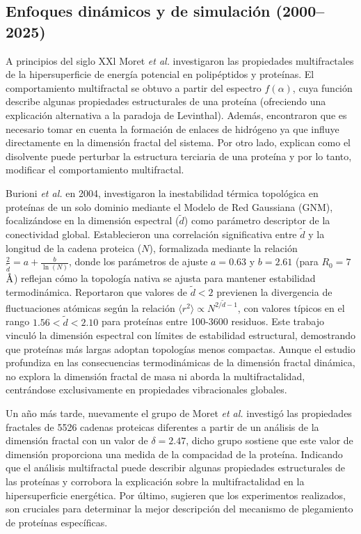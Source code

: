 \subsection{Enfoques din\'{a}micos y de simulaci\'{o}n (2000--2025)}
\label{subsec:edds}

A principios del siglo XXl Moret \textit{et al.}\cite{Moret2001} investigaron las propiedades multifractales de la hipersuperficie de energ\'{i}a potencial en polip\'{e}ptidos y prote\'{i}nas. El comportamiento multifractal se obtuvo a partir del espectro $f(\alpha)$, cuya funci\'{o}n describe algunas propiedades estructurales de una prote\'{i}na (ofreciendo una explicaci\'{o}n alternativa a la paradoja de Levinthal). Adem\'{a}s, encontraron que es necesario tomar en cuenta la formaci\'{o}n de enlaces de hidr\'{o}geno ya que influye directamente en la dimensi\'{o}n fractal del sistema. Por otro lado, explican como el disolvente puede perturbar la estructura terciaria de una prote\'{i}na y por lo tanto, modificar el comportamiento multifractal.

Burioni \textit{et al.} en 2004, \cite{Burioni2004} investigaron la inestabilidad térmica topológica en proteínas de un solo dominio mediante el Modelo de Red Gaussiana (GNM), focalizándose en la dimensión espectral ($\tilde{d}$) como parámetro descriptor de la conectividad global. Establecieron una correlación significativa entre $\tilde{d}$ y la longitud de la cadena proteica ($N$), formalizada mediante la relación $\frac{2}{\tilde{d}} = a + \frac{b}{\ln(N)}$, donde los parámetros de ajuste $a = 0.63$ y $b = 2.61$ (para $R_0 = 7$ $\textup{\r{A}}$) reflejan cómo la topología nativa se ajusta para mantener estabilidad termodinámica. Reportaron que valores de $\tilde{d} < 2$ previenen la divergencia de fluctuaciones atómicas según la relación $\langle r^2 \rangle \propto N^{2/\tilde{d}-1}$, con valores típicos en el rango $1.56 < \tilde{d} < 2.10$ para proteínas entre 100-3600 residuos. Este trabajo vinculó la dimensión espectral con límites de estabilidad estructural, demostrando que proteínas más largas adoptan topologías menos compactas. Aunque el estudio profundiza en las consecuencias termodinámicas de la dimensión fractal dinámica, no explora la dimensión fractal de masa ni aborda la multifractalidad, centrándose exclusivamente en propiedades vibracionales globales.

Un año m\'{a}s tarde, nuevamente el grupo de Moret \textit{et al.} \cite{Moret2005} investig\'{o} las propiedades fractales de 5526 cadenas proteicas diferentes a partir de un an\'{a}lisis de la dimensi\'{o}n fractal con un valor de $\delta = 2.47$, dicho grupo sostiene que este valor de dimensi\'{o}n proporciona una medida de la compacidad de la prote\'{i}na. Indicando que el an\'{a}lisis multifractal puede describir algunas propiedades estructurales de las prote\'{i}nas y corrobora la explicaci\'{o}n sobre la multifractalidad en la hipersuperficie energ\'{e}tica. Por \'{u}ltimo, sugieren que los experimentos realizados, son cruciales para determinar la mejor descripci\'{o}n del mecanismo de plegamiento de prote\'{i}nas espec\'{i}ficas.

